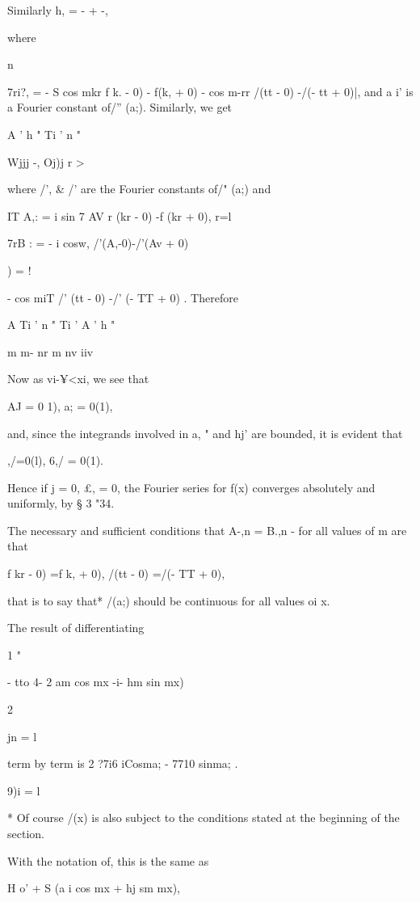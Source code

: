 Similarly h, = - + -,

where

n

7ri?, = - S cos mkr f k. - 0) - f(k, + 0) - cos m-rr /(tt - 0) -/(- tt
+ 0)|, and a i' is a Fourier constant of/'' (a;). Similarly, we get

A ' h " Ti ' n "

Wjjj -, Oj)j r >

where /', \& /' are the Fourier constants of/" (a;) and

IT A,: = i sin 7 AV r (kr - 0) -f (kr + 0), r=l

7rB : = - i cosw, /'(A,-0)-/'(Av + 0)

) = !

- cos miT /' (tt - 0) -/' (- TT + 0) . Therefore

A Ti ' n " Ti ' A ' h "

m m- nr m nv iiv

Now as vi-¥<xi, we see that

AJ = 0 1), a; = 0(1),

and, since the integrands involved in a, " and hj' are bounded, it is
evident that

,/=0(l), 6,/ = 0(1).

Hence if j = 0, £, = 0, the Fourier series for f(x) converges
absolutely and uniformly, by § 3 "34.

The necessary and sufficient conditions that A-,n = B.,n - for all
values of m are that

f kr - 0) =f k, + 0), /(tt - 0) =/(- TT + 0),

that is to say that* /(a;) should be continuous for all values oi x.


The result of differentiating

1 "

- tto 4- 2 am cos mx -i- hm sin mx)

2

jn = l

term by term is 2 ?7i6 iCosma; - 7710 sinma; .

9)i = l

* Of course /(x) is also subject to the conditions stated at the
beginning of the section.

%
%

With the notation of, this is the same as

H o' + S (a i cos mx + hj sm mx),


